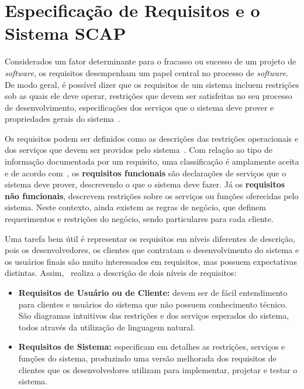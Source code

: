 \chapter{Especificação de Requisitos e o Sistema SCAP}
\label{sec-requisitos}

Considerados um fator determinante para o fracasso ou sucesso de um projeto de \textit{software}, os requisitos desempenham um papel central no processo de \textit{software}. De modo geral, é possível dizer que os requisitos de um sistema incluem restrições sob as quais ele deve operar, restrições que devem ser satisfeitas no seu processo de desenvolvimento, especificações dos serviços que o sistema deve prover e propriedades gerais do sistema~\cite{falbo:er17}.

Os requisitos podem ser definidos como as descrições das restrições operacionais e dos serviços que devem ser providos pelo sistema~\cite{sommerville:es07}. Com relação ao tipo de informação documentada por um requisito, uma classificação é amplamente aceita e de acordo com~, os \textbf{requisitos funcionais} são declarações de serviços que o sistema deve prover, descrevendo o que o sistema deve fazer. Já os \textbf{requisitos não funcionais}, descrevem restrições sobre os serviços ou funções oferecidas pelo sistema. Neste contexto, ainda existem as regras de negócio, que definem requerimentos e restrições do negócio, sendo particulares para cada cliente.

Uma tarefa bem útil é representar os requisitos em níveis diferentes de descrição, pois os desenvolvedores, os clientes que contratam o desenvolvimento do sistema e os usuários finais são muito interessados em requisitos, mas possuem expectativas distintas. Assim,~ realiza a descrição de dois níveis de requisitos:

\begin{itemize}

	\item \textbf{Requisitos de Usuário ou de Cliente:} devem ser de fácil entendimento para clientes e usuários do sistema que não possuem conhecimento técnico. São diagramas intuitivos das restrições e dos serviços esperados do sistema, todos através da utilização de linguagem natural.
	
	\item \textbf{Requisitos de Sistema:} especificam em detalhes as restrições, serviços e funções do sistema, produzindo uma versão melhorada dos requisitos de clientes que os desenvolvedores utilizam para implementar, projetar e testar o sistema. 

\end{itemize}

